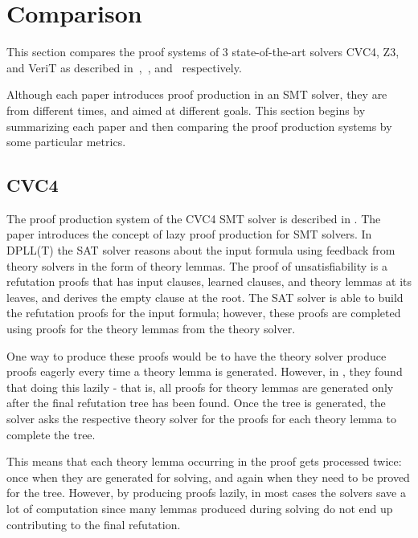 \documentclass{article}
\begin{document}
\section{Comparison}
\label{sec:comp}
This section compares the proof systems of 3 state-of-the-art 
solvers CVC4, Z3, and VeriT as described in~\cite{DBLP:conf/fmcad/KatzBTRH16},~\cite{DBLP:conf/lpar/MouraB08}, 
and~\cite{DBLP:conf/tacas/FontaineMMNT06} respectively.

Although each paper introduces proof production in an SMT 
solver, they are from different times, and aimed at different 
goals. This section begins by summarizing each paper and then 
comparing the proof production systems by some particular 
metrics.

\subsection{CVC4}
\label{sec:cvc4}
The proof production system of the CVC4 SMT solver is described 
in \cite{DBLP:conf/fmcad/KatzBTRH16}. The paper introduces the 
concept of lazy proof production for SMT solvers. In DPLL(T) 
the SAT solver reasons about the input formula using feedback 
from theory solvers in the form of theory lemmas. The proof 
of unsatisfiability is a refutation proofs that has input clauses,
learned clauses, and theory lemmas at its leaves, 
and derives the empty clause at the root. The SAT solver is able 
to build the refutation proofs for the input formula; however,
these proofs are completed using proofs for the theory
lemmas from the theory solver. 

One way to produce these proofs would be to have the theory solver 
produce proofs eagerly every time a theory lemma is generated. 
However, in \cite{DBLP:conf/fmcad/KatzBTRH16}, they found that
doing this lazily - that is, all proofs for theory lemmas are 
generated only after the final refutation tree has been found. 
Once the tree is generated, the solver asks the respective theory
solver for the proofs for each theory lemma to complete the tree.

This means that each theory lemma occurring in the proof gets 
processed twice: once when they are generated for solving, and 
again when they need to be proved for the tree. However, by 
producing proofs lazily, in most cases the solvers save a lot 
of computation since many lemmas produced during solving do not
end up contributing to the final refutation.
\end{document}
